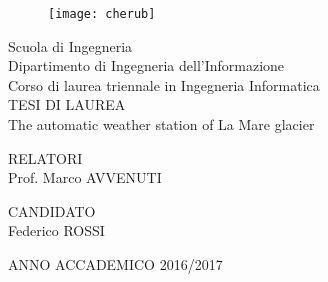 \begin{titlepage}

    \begin{figure}
      \centering
      \texttt{[image: cherub]}
    \end{figure}

    \begin{center}
      Scuola di Ingegneria\\
      Dipartimento di Ingegneria dell'Informazione\\
      Corso di laurea triennale in Ingegneria Informatica\\
      \vspace*{5\baselineskip}
      TESI DI LAUREA\\
      The automatic weather station of La Mare glacier
      \vspace*{10\baselineskip}      
    \end{center}
    
    \begin{flushleft}
      RELATORI\\
      Prof. Marco AVVENUTI\\
    \end{flushleft}
    
    \begin{flushright}
      CANDIDATO\\
      Federico ROSSI
    \end{flushright}
    \vspace{\fill}
    \begin{center}
        ANNO ACCADEMICO 2016/2017
    \end{center}
\end{titlepage}